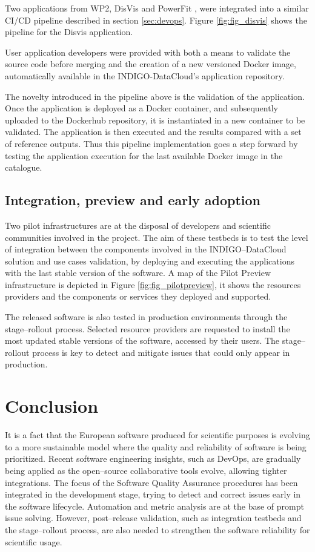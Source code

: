 \documentclass[journal]{IEEEtran}
\begin{document}
Two applications from WP2, DisVis \cite{disvis} and PowerFit \cite{powerfit}, were
integrated into a similar CI/CD pipeline described in section \ref{sec:devops}.
Figure \ref{fig:fig_disvis} shows the pipeline for the Disvis application.

User application developers were provided with both a means to validate the
source code before merging and the creation of a new versioned Docker image,
automatically available in the INDIGO-DataCloud’s application repository.

The novelty introduced in the pipeline above is the validation of the application.
Once the application is deployed as a Docker container, and subsequently uploaded
to the Dockerhub repository, it is instantiated in a new container to be validated.
The application is then executed and the results compared with a set of reference outputs.
Thus this pipeline implementation goes a step forward by testing the application
execution for the last available Docker image in the catalogue.

\subsection{Integration, preview and early adoption}

Two pilot infrastructures are at the disposal of developers and scientific
communities involved in the project. The aim of these testbeds is to test the
level of integration between the components involved in the INDIGO--DataCloud
solution and use cases validation, by deploying and executing the applications
with the last stable version of the software. A map of the Pilot Preview
infrastructure is depicted in Figure \ref{fig:fig_pilotpreview}, it shows the
resources providers and the components or services they deployed and supported.


The released software is also tested in production environments through the
stage--rollout process. Selected resource providers are requested to install
the most updated stable versions of the software, accessed by their users. The
stage--rollout process is key to detect and mitigate issues that could only
appear in production.

\section{Conclusion}
\label{sec:con}

It is a fact that the European software produced for scientific purposes is
evolving to a more sustainable model where the quality and reliability of
software is being prioritized. Recent software engineering insights, such as
DevOps, are gradually being applied as the open--source collaborative tools
evolve, allowing tighter integrations. The focus of the Software Quality
Assurance procedures has been integrated in the development stage, trying to
detect and correct issues early in the software lifecycle. Automation and
metric analysis are at the base of prompt issue solving. However, post--release
validation, such as integration testbeds and the stage--rollout process, are
also needed to strengthen the software reliability for scientific usage.
\end{document}
